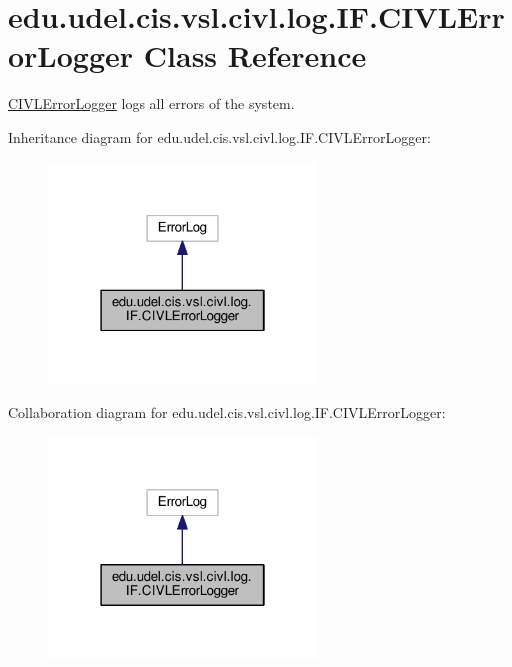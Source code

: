 \hypertarget{classedu_1_1udel_1_1cis_1_1vsl_1_1civl_1_1log_1_1IF_1_1CIVLErrorLogger}{}\section{edu.\+udel.\+cis.\+vsl.\+civl.\+log.\+I\+F.\+C\+I\+V\+L\+Error\+Logger Class Reference}
\label{classedu_1_1udel_1_1cis_1_1vsl_1_1civl_1_1log_1_1IF_1_1CIVLErrorLogger}


\hyperlink{classedu_1_1udel_1_1cis_1_1vsl_1_1civl_1_1log_1_1IF_1_1CIVLErrorLogger}{C\+I\+V\+L\+Error\+Logger} logs all errors of the system.  




Inheritance diagram for edu.\+udel.\+cis.\+vsl.\+civl.\+log.\+I\+F.\+C\+I\+V\+L\+Error\+Logger\+:
\nopagebreak
\begin{figure}[H]
\begin{center}
\leavevmode
\includegraphics[width=202pt]{classedu_1_1udel_1_1cis_1_1vsl_1_1civl_1_1log_1_1IF_1_1CIVLErrorLogger__inherit__graph}
\end{center}
\end{figure}


Collaboration diagram for edu.\+udel.\+cis.\+vsl.\+civl.\+log.\+I\+F.\+C\+I\+V\+L\+Error\+Logger\+:
\nopagebreak
\begin{figure}[H]
\begin{center}
\leavevmode
\includegraphics[width=202pt]{classedu_1_1udel_1_1cis_1_1vsl_1_1civl_1_1log_1_1IF_1_1CIVLErrorLogger__coll__graph}
\end{center}
\end{figure}
